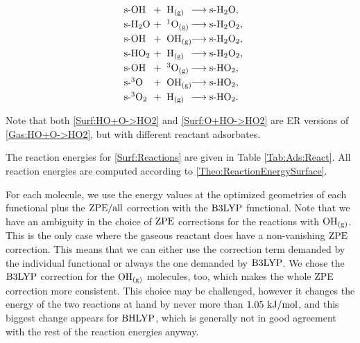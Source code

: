 \documentclass[8.5pt,twoside,twocolumn]{article}
\newcommand\zpe{\enmat{\te{ZPE}}}
\newcommand\zpeall{\enmat{\zpe/\te{all}}}
\newcommand\sur{\enmat{\te{s-}}}
\newcommand\gas{\enmat{_\te{(g)}}}
\newcommand\singo{\enmat{{^1\te{O}}}}
\newcommand\tripo{\enmat{{^3\te{O}}}}
\newcommand\tripot{\enmat{{^3\ot}}}
\newcommand\kmo{\enmat{\te {kJ/mol}}}
\theoremstyle{standard}
\begin{document}
\renewcommand\ronebox[1]{\makebox[1cm][l]{\enmat{#1}}}
\renewcommand\rtwobox[1]{\makebox[1.cm][l]{\ \enmat{#1}}}
\renewcommand\prodbox[1]{\makebox[1.65cm][l]{\enmat{#1}}}
\begin{subequations}
\begin{align}
   \label{Surf:HO+H->H2O}
   \ronebox{\sur\ho}+\rtwobox{\te{H}\gas}\prodbox{\chemar\sur\hto,} \\ 
   \label{Surf:H2O+O->H2O2}
   \ronebox{\sur\hto}+\rtwobox{\singo\gas}\prodbox{\chemar\sur\htot,} \\
   \label{Surf:HO+HO->H2O2}
   \ronebox{\sur\ho}+\rtwobox{\ho\gas}\prodbox{\chemar\sur\htot,} \\
   \label{Surf:HO2+H->H2O2}
   \ronebox{\sur\hot}+\rtwobox{\te{H}\gas}\prodbox{\chemar\sur\htot,} \\
   \label{Surf:HO+O->HO2}
   \ronebox{\sur\ho}+\rtwobox{\tripo\gas}\prodbox{\chemar\sur\hot,} \\
   \label{Surf:O+HO->HO2}
   \ronebox{\sur\tripo}+\rtwobox{\ho\gas}\prodbox{\chemar\sur\hot,} \\
   \label{Surf:3O2+H->HO2}
   \ronebox{\sur\tripot}+\rtwobox{\te{H}\gas}\prodbox{\chemar\sur\hot.}
\end{align}
\label{Surf:Reactions}
\end{subequations}

Note that both \eqref{Surf:HO+O->HO2} and \eqref{Surf:O+HO->HO2} are ER
versions of \eqref{Gas:HO+O->HO2}, but with different reactant adsorbates.

The reaction energies for \eqref{Surf:Reactions} are given in Table \ref{Tab:Ads:React}.
All reaction energies are computed according to \eqref{Theo:ReactionEnergySurface}.

For each molecule, we use the energy values at the optimized
geometries of each functional plus the $\zpeall$ correction with the $\text{B3LYP}$ functional. Note that we have an ambiguity in the choice
of $\zpe$ corrections for the reactions with $\ho\gas$. This is the only
case where the gaseous reactant does have a non-vanishing $\zpe$ correction.
This means that we can either use the correction term demanded by the
individual functional or always the one demanded by $\text{B3LYP}$. We chose
the $\text{B3LYP}$ correction for the $\ho\gas$ molecules, too, which makes the whole
ZPE correction more consistent. This choice may be challenged, however it 
changes the energy of the two reactions at hand by never more than $1.05~\kmo$,
and this biggest change appears for $\text{BHLYP}$, which is generally not in good
agreement with the rest of the reaction energies anyway.
\end{document}
